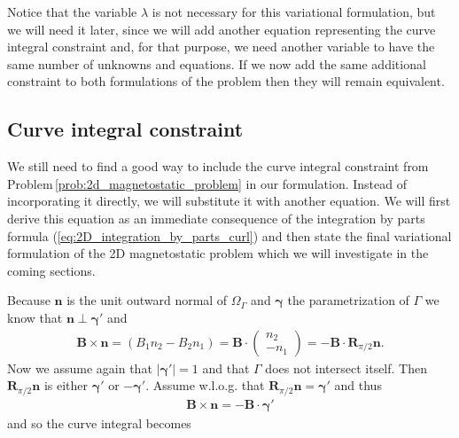 \documentclass[../master_thesis.tex]{subfiles}
\begin{document}
Notice that the variable $\lambda$ is not necessary for this variational formulation, 
but we will need it later, since we will add another equation representing the 
curve integral constraint and, for that purpose, we need another variable to have the same 
number of unknowns and equations.
If we now add the same additional constraint to both formulations of the problem 
then they will remain equivalent.


\subsection{Curve integral constraint}\label{sec:curve_integral_constraint}

We still need to find a good way to include the curve integral constraint from 
Problem\,\ref{prob:2d_magnetostatic_problem} in our formulation. Instead of incorporating 
it directly, we will substitute it with another equation. We will first derive this 
equation as an immediate consequence of the integration by parts formula 
(\ref{eq:2D_integration_by_parts_curl}) and then state the 
final variational formulation of the 2D magnetostatic problem which we 
will investigate in the coming sections.

Because $\mathbf{n}$ is the unit outward normal 
of $\Omega_\Gamma$ and $\bm{\gamma}$ the parametrization of $\Gamma$ we know that $\mathbf{n} \perp \bm{\gamma}'$
and
\begin{align*}
    \mathbf{B}\times \mathbf{n} 
    = (B_1 n_2 - B_2 n_1) = \mathbf{B} \cdot \begin{pmatrix}n_2 \\ -n_1 \end{pmatrix}
    = -\mathbf{B} \cdot \mathbf{R}_{\pi/2}\mathbf{n}.
\end{align*}
Now we assume again that $|\bm{\gamma}'| = 1$ and that $\Gamma$ does not intersect itself.
Then $\mathbf{R}_{\pi/2} \mathbf{n}$ is either $\bm{\gamma}'$ or $-\bm{\gamma}'$. Assume w.l.o.g.
that $\mathbf{R}_{\pi/2} \mathbf{n} = \bm{\gamma}'$ and thus 
\begin{align*}
    \mathbf{B} \times \mathbf{n} = -\mathbf{B} \cdot \bm{\gamma}'
\end{align*}
and so the curve integral becomes
\end{document}
